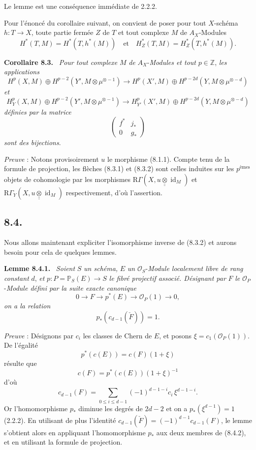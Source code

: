 \documentclass[11pt]{article}
\newenvironment{statement}[1]{\par\medskip\noindent\textbf{#1.}\ }{\par\medskip}
\newcommand{\R}{\mathrm{R}}\newcommand{\RHomCore}{\mathrm{RHom}}
\providecommand{\R}{\mathrm R}
\begin{document}
Le lemme est une conséquence immédiate de 2.2.2.

Pour l'énoncé du corollaire suivant, on convient de poser pour tout $X$-schéma $h:T\to X$, toute partie fermée $Z$ de $T$ et tout complexe $M$ de $A_X$-Modules
\[
H^*(T,M)=H^*(T,h^*(M))
\quad\text{et}\quad
H^*_Z(T,M)=H^*_Z(T,h^*(M)).
\]

\begin{statement}{Corollaire 8.3}
\emph{Pour tout complexe} $M$ \emph{de} $A_X$-\emph{Modules et tout} $p\in\mathbb Z$, \emph{les applications}
\[
H^p(X,M)\oplus H^{p-2}(Y',M\otimes\mu^{\otimes -1})
\to
H^p(X',M)\oplus H^{p-2d}(Y,M\otimes\mu^{\otimes -d})
\tag{8.3.1.}
\]
\emph{et}
\[
H_Y^p(X,M)\oplus H^{p-2}(Y',M\otimes\mu^{\otimes -1})
\to
H_{Y'}^p(X',M)\oplus H^{p-2d}(Y,M\otimes\mu^{\otimes -d})
\tag{8.3.2}
\]
\emph{définies par la matrice}
\[
\begin{pmatrix}
f^*&j_*\\
0&g_*
\end{pmatrix}
\]
\emph{sont des bijections}.
\end{statement}

\emph{Preuve} : Notons provisoirement $u$ le morphisme (8.1.1). Compte tenu de la formule de projection, les flèches (8.3.1) et (8.3.2) sont celles induites sur les $p^{\text{èmes}}$ objets de cohomologie par les morphismes $\R\Gamma(X,u\mathbin{\underline{\underline{\otimes}}}\operatorname{id}_M)$ et $\R\Gamma_Y(X,u\mathbin{\underline{\underline{\otimes}}}\operatorname{id}_M)$ respectivement, d'où l'assertion.

\subsection*{8.4.}

Nous allons maintenant expliciter l'isomorphisme inverse de (8.3.2) et aurons besoin pour cela de quelques lemmes.

\begin{statement}{Lemme 8.4.1}
\emph{Soient} $S$ \emph{un schéma,} $E$ \emph{un} $\mathcal O_S$-\emph{Module localement libre de rang constant} $d$, \emph{et} $p:P=\mathbb P_S(E)\to S$ \emph{le fibré projectif associé. Désignant par} $F$ \emph{le} $\mathcal O_P$-\emph{Module défini par la suite exacte canonique}
\[
0\to F\to p^*(E)\to\mathcal O_P(1)\to0,
\]
\emph{on a la relation}
\[
p_*(c_{d-1}(\check F))=1.
\]
\end{statement}

\emph{Preuve} : Désignons par $c_i$ les classes de Chern de $E$, et posons $\xi=c_1(\mathcal O_P(1))$. De l'égalité
\[
p^*(c(E))=c(F)(1+\xi)
\]
résulte que
\[
c(F)=p^*(c(E))(1+\xi)^{-1}
\]
d'où
\[
c_{d-1}(F)=\sum_{0\le i\le d-1}(-1)^{d-1-i}c_i\,\xi^{d-1-i}.
\tag{8.4.2}
\]
Or l'homomorphisme $p_*$ diminue les degrés de $2d-2$ et on a $p_*(\xi^{d-1})=1$ (2.2.2). En utilisant de plus l'identité $c_{d-1}(\check F)=(-1)^{d-1}c_{d-1}(F)$, le lemme s'obtient alors en appliquant l'homomorphisme $p_*$ aux deux membres de (8.4.2), et en utilisant la formule de projection.
\end{document}
